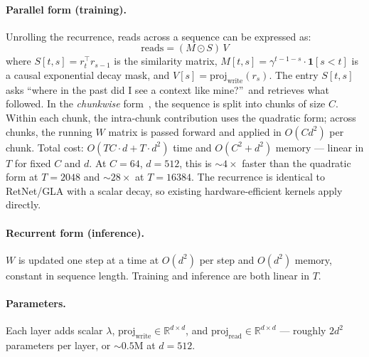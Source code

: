 \documentclass{article}
\begin{document}
\paragraph{Parallel form (training).}
Unrolling the recurrence, reads across a sequence can be expressed as:
\begin{equation}
    \text{reads} = (M \odot S)\, V
\end{equation}
where $S[t,s] = r_t^\top r_{s-1}$ is the similarity matrix, $M[t,s] = \gamma^{t-1-s} \cdot \mathbf{1}[s < t]$ is a causal exponential decay mask, and $V[s] = \text{proj}_\text{write}(r_s)$. The entry $S[t,s]$ asks ``where in the past did I see a context like mine?''\ and retrieves what followed. In the \emph{chunkwise} form~\citep{yang2023gated}, the sequence is split into chunks of size $C$. Within each chunk, the intra-chunk contribution uses the quadratic form; across chunks, the running $W$ matrix is passed forward and applied in $O(Cd^2)$ per chunk. Total cost: $O(TC \cdot d + T \cdot d^2)$ time and $O(C^2 + d^2)$ memory --- linear in $T$ for fixed $C$ and $d$. At $C{=}64$, $d{=}512$, this is ${\sim}4\times$ faster than the quadratic form at $T{=}2048$ and ${\sim}28\times$ at $T{=}16384$. The recurrence is identical to RetNet/GLA with a scalar decay, so existing hardware-efficient kernels apply directly.

\paragraph{Recurrent form (inference).}
$W$ is updated one step at a time at $O(d^2)$ per step and $O(d^2)$ memory, constant in sequence length. Training and inference are both linear in $T$.

\paragraph{Parameters.}
Each layer adds scalar $\lambda$, $\text{proj}_\text{write} \in \mathbb{R}^{d \times d}$, and $\text{proj}_\text{read} \in \mathbb{R}^{d \times d}$ --- roughly $2d^2$ parameters per layer, or ${\sim}0.5$M at $d=512$.
\end{document}
